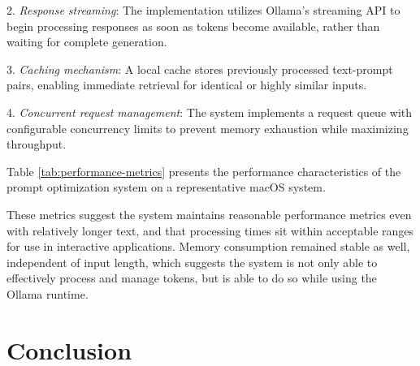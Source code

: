 2. \textit{Response streaming}: The implementation utilizes Ollama's streaming API to begin processing responses as soon as tokens become available, rather than waiting for complete generation.


3. \textit{Caching mechanism}: A local cache stores previously processed text-prompt pairs, enabling immediate retrieval for identical or highly similar inputs.


4. \textit{Concurrent request management}: The system implements a request queue with configurable concurrency limits to prevent memory exhaustion while maximizing throughput.


Table \ref{tab:performance-metrics} presents the performance characteristics of the prompt optimization system on a representative macOS system.

\begin{center}
    
    \vspace{1pt}
    \label{tab:performance-metrics}
\end{center}

These metrics suggest the system maintains reasonable performance metrics even with relatively longer text, and that processing times sit within acceptable ranges for use in interactive applications. Memory consumption remained stable as well, independent of input length, which suggests the system is not only able to effectively process and manage tokens, but is able to do so while using the Ollama runtime.


\section{Conclusion}
\label{sec:prompt-conclusion}

